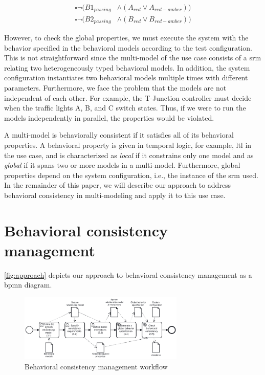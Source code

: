 \documentclass{jot}
\begin{document}
\begin{align}
    \square\neg(B1_{passing} & \land (A_{red} \lor A_{red-amber})) \label{eq:property3} \\
    \square\neg(B2_{passing} & \land (B_{red} \lor B_{red-amber})) \label{eq:property4}
\end{align}

However, to check the global properties, we must execute the system with the behavior specified in the behavioral models according to the test configuration.
This is not straightforward since the multi-model of the use case consists of a \gls*{srm} relating two heterogeneously typed behavioral models.
In addition, the system configuration instantiates two behavioral models multiple times with different parameters.
Furthermore, we face the problem that the models are not independent of each other.
For example, the T-Junction controller must decide when the traffic lights A, B, and C switch states.
Thus, if we were to run the models independently in parallel, the properties would be violated.

A multi-model is behaviorally consistent if it satisfies all of its behavioral properties.
A behavioral property is given in temporal logic, for example, \gls*{ltl} in the use case, and is characterized as \emph{local} if it constrains only one model and as \emph{global} if it spans two or more models in a multi-model.
Furthermore, global properties depend on the system configuration, i.e., the instance of the \gls*{srm} used.
In the remainder of this paper, we will describe our approach to address behavioral consistency in multi-modeling and apply it to this use case.


\section{Behavioral consistency management} \label{sec:behavioral_consistency_checking}

\autoref{fig:approach} depicts our approach to behavioral consistency management as a \gls*{bpmn} diagram.

\begin{figure}[h]
    \centering
    \includegraphics[width=0.7\textwidth]{figures/workflow.pdf}
    \caption{Behavioral consistency management workflow}
    \label{fig:approach}
\end{figure}
\end{document}
